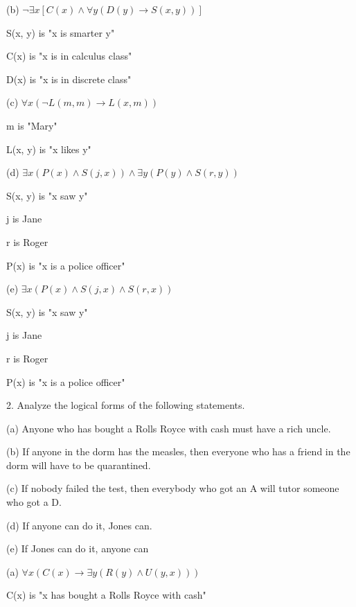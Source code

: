 \documentclass{article}
\begin{document}
(b) $\neg \exists x [C(x) \land \forall y (D(y) \to S(x, y))]$

S(x, y) is "x is smarter y"

C(x) is "x is in calculus class"

D(x) is "x is in discrete class"
\vspace{20pt}

(c) $\forall x (\neg L(m, m) \to L(x, m))$

m is "Mary"

L(x, y) is "x likes y"
\vspace{20pt}

(d) $\exists x (P(x) \land S(j, x)) \land \exists y (P(y) \land S(r, y))$

S(x, y) is "x saw y"

j is Jane

r is Roger

P(x) is "x is a police officer"

\vspace{20pt}

(e) $\exists x (P(x) \land S(j, x) \land S(r, x))$

S(x, y) is "x saw y"

j is Jane

r is Roger

P(x) is "x is a police officer"

\vspace{30pt}

2. Analyze the logical forms of the following statements.

\hspace{12pt}(a) Anyone who has bought a Rolls Royce with cash must have a rich
uncle.

\hspace{12pt}(b) If anyone in the dorm has the measles, then everyone who has a friend
in the dorm will have to be quarantined.

\hspace{12pt}(c) If nobody failed the test, then everybody who got an A will tutor
someone who got a D.

\hspace{12pt}(d) If anyone can do it, Jones can.

\hspace{12pt}(e) If Jones can do it, anyone can
\vspace{30pt}

(a) $\forall x (C(x) \to \exists y (R(y) \land U(y, x)))$

C(x) is "x has bought a Rolls Royce with cash"
\end{document}
